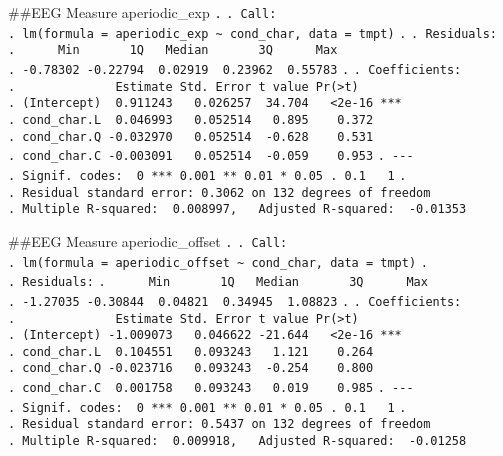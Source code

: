 \documentclass[
]{article}
\begin{document}
\#\#EEG Measure aperiodic\_exp \texttt{.} \texttt{.\ Call:}
\texttt{.\ lm(formula\ =\ aperiodic\_exp\ \textasciitilde{}\ cond\_char,\ data\ =\ tmpt)}
\texttt{.} \texttt{.\ Residuals:}
\texttt{.\ \ \ \ \ \ Min\ \ \ \ \ \ \ 1Q\ \ \ Median\ \ \ \ \ \ \ 3Q\ \ \ \ \ \ Max}
\texttt{.\ -0.78302\ -0.22794\ \ 0.02919\ \ 0.23962\ \ 0.55783}
\texttt{.} \texttt{.\ Coefficients:}
\texttt{.\ \ \ \ \ \ \ \ \ \ \ \ \ \ Estimate\ Std.\ Error\ t\ value\ Pr(\textgreater{}\textbar{}t\textbar{})}
\texttt{.\ (Intercept)\ \ 0.911243\ \ \ 0.026257\ \ 34.704\ \ \ \textless{}2e-16\ ***}
\texttt{.\ cond\_char.L\ \ 0.046993\ \ \ 0.052514\ \ \ 0.895\ \ \ \ 0.372}
\texttt{.\ cond\_char.Q\ -0.032970\ \ \ 0.052514\ \ -0.628\ \ \ \ 0.531}
\texttt{.\ cond\_char.C\ -0.003091\ \ \ 0.052514\ \ -0.059\ \ \ \ 0.953}
\texttt{.\ -\/-\/-}
\texttt{.\ Signif.\ codes:\ \ 0\ \textquotesingle{}***\textquotesingle{}\ 0.001\ \textquotesingle{}**\textquotesingle{}\ 0.01\ \textquotesingle{}*\textquotesingle{}\ 0.05\ \textquotesingle{}.\textquotesingle{}\ 0.1\ \textquotesingle{}\ \textquotesingle{}\ 1}
\texttt{.}
\texttt{.\ Residual\ standard\ error:\ 0.3062\ on\ 132\ degrees\ of\ freedom}
\texttt{.\ Multiple\ R-squared:\ \ 0.008997,\ \ \ Adjusted\ R-squared:\ \ -0.01353}

\#\#EEG Measure aperiodic\_offset \texttt{.} \texttt{.\ Call:}
\texttt{.\ lm(formula\ =\ aperiodic\_offset\ \textasciitilde{}\ cond\_char,\ data\ =\ tmpt)}
\texttt{.} \texttt{.\ Residuals:}
\texttt{.\ \ \ \ \ \ Min\ \ \ \ \ \ \ 1Q\ \ \ Median\ \ \ \ \ \ \ 3Q\ \ \ \ \ \ Max}
\texttt{.\ -1.27035\ -0.30844\ \ 0.04821\ \ 0.34945\ \ 1.08823}
\texttt{.} \texttt{.\ Coefficients:}
\texttt{.\ \ \ \ \ \ \ \ \ \ \ \ \ \ Estimate\ Std.\ Error\ t\ value\ Pr(\textgreater{}\textbar{}t\textbar{})}
\texttt{.\ (Intercept)\ -1.009073\ \ \ 0.046622\ -21.644\ \ \ \textless{}2e-16\ ***}
\texttt{.\ cond\_char.L\ \ 0.104551\ \ \ 0.093243\ \ \ 1.121\ \ \ \ 0.264}
\texttt{.\ cond\_char.Q\ -0.023716\ \ \ 0.093243\ \ -0.254\ \ \ \ 0.800}
\texttt{.\ cond\_char.C\ \ 0.001758\ \ \ 0.093243\ \ \ 0.019\ \ \ \ 0.985}
\texttt{.\ -\/-\/-}
\texttt{.\ Signif.\ codes:\ \ 0\ \textquotesingle{}***\textquotesingle{}\ 0.001\ \textquotesingle{}**\textquotesingle{}\ 0.01\ \textquotesingle{}*\textquotesingle{}\ 0.05\ \textquotesingle{}.\textquotesingle{}\ 0.1\ \textquotesingle{}\ \textquotesingle{}\ 1}
\texttt{.}
\texttt{.\ Residual\ standard\ error:\ 0.5437\ on\ 132\ degrees\ of\ freedom}
\texttt{.\ Multiple\ R-squared:\ \ 0.009918,\ \ \ Adjusted\ R-squared:\ \ -0.01258}
\end{document}
